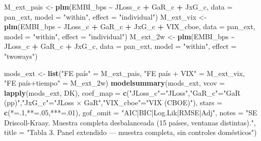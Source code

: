 \documentclass[
]{article}
\newenvironment{Shaded}{\begin{snugshade}}{\end{snugshade}}
\newcommand{\AttributeTok}[1]{\textcolor[rgb]{0.13,0.29,0.53}{#1}}
\newcommand{\DecValTok}[1]{\textcolor[rgb]{0.00,0.00,0.81}{#1}}
\newcommand{\FunctionTok}[1]{\textcolor[rgb]{0.13,0.29,0.53}{\textbf{#1}}}
\newcommand{\NormalTok}[1]{#1}
\newcommand{\OtherTok}[1]{\textcolor[rgb]{0.56,0.35,0.01}{#1}}
\newcommand{\SpecialCharTok}[1]{\textcolor[rgb]{0.81,0.36,0.00}{\textbf{#1}}}
\newcommand{\StringTok}[1]{\textcolor[rgb]{0.31,0.60,0.02}{#1}}
\begin{document}
\begin{Shaded}
\begin{Highlighting}[]
\NormalTok{M\_ext\_pais }\OtherTok{\textless{}{-}} \FunctionTok{plm}\NormalTok{(EMBI\_bps }\SpecialCharTok{\textasciitilde{}}\NormalTok{ JLoss\_c }\SpecialCharTok{+}\NormalTok{ GaR\_c }\SpecialCharTok{+}\NormalTok{ JxG\_c, }\AttributeTok{data =}\NormalTok{ pan\_ext, }\AttributeTok{model =} \StringTok{"within"}\NormalTok{, }\AttributeTok{effect =} \StringTok{"individual"}\NormalTok{)}
\NormalTok{M\_ext\_vix  }\OtherTok{\textless{}{-}} \FunctionTok{plm}\NormalTok{(EMBI\_bps }\SpecialCharTok{\textasciitilde{}}\NormalTok{ JLoss\_c }\SpecialCharTok{+}\NormalTok{ GaR\_c }\SpecialCharTok{+}\NormalTok{ JxG\_c }\SpecialCharTok{+}\NormalTok{ VIX\_cboe, }\AttributeTok{data =}\NormalTok{ pan\_ext, }\AttributeTok{model =} \StringTok{"within"}\NormalTok{, }\AttributeTok{effect =} \StringTok{"individual"}\NormalTok{)}
\NormalTok{M\_ext\_2w   }\OtherTok{\textless{}{-}} \FunctionTok{plm}\NormalTok{(EMBI\_bps }\SpecialCharTok{\textasciitilde{}}\NormalTok{ JLoss\_c }\SpecialCharTok{+}\NormalTok{ GaR\_c }\SpecialCharTok{+}\NormalTok{ JxG\_c, }\AttributeTok{data =}\NormalTok{ pan\_ext, }\AttributeTok{model =} \StringTok{"within"}\NormalTok{, }\AttributeTok{effect =} \StringTok{"twoways"}\NormalTok{)}

\NormalTok{mods\_ext }\OtherTok{\textless{}{-}} \FunctionTok{list}\NormalTok{(}\StringTok{"FE país"} \OtherTok{=}\NormalTok{ M\_ext\_pais, }\StringTok{"FE país + VIX"} \OtherTok{=}\NormalTok{ M\_ext\_vix, }\StringTok{"FE país+tiempo"} \OtherTok{=}\NormalTok{ M\_ext\_2w)}
\FunctionTok{modelsummary}\NormalTok{(mods\_ext, }\AttributeTok{vcov =} \FunctionTok{lapply}\NormalTok{(mods\_ext, DK),}
  \AttributeTok{coef\_map =} \FunctionTok{c}\NormalTok{(}\StringTok{"JLoss\_c"}\OtherTok{=}\StringTok{"JLoss"}\NormalTok{,}\StringTok{"GaR\_c"}\OtherTok{=}\StringTok{"GaR (pp)"}\NormalTok{,}\StringTok{"JxG\_c"}\OtherTok{=}\StringTok{"JLoss × GaR"}\NormalTok{,}\StringTok{"VIX\_cboe"}\OtherTok{=}\StringTok{"VIX (CBOE)"}\NormalTok{),}
  \AttributeTok{stars =} \FunctionTok{c}\NormalTok{(}\StringTok{\textquotesingle{}*\textquotesingle{}}\OtherTok{=}\NormalTok{.}\DecValTok{1}\NormalTok{,}\StringTok{\textquotesingle{}**\textquotesingle{}}\OtherTok{=}\NormalTok{.}\DecValTok{05}\NormalTok{,}\StringTok{\textquotesingle{}***\textquotesingle{}}\OtherTok{=}\NormalTok{.}\DecValTok{01}\NormalTok{), }\AttributeTok{gof\_omit =} \StringTok{"AIC|BIC|Log.Lik|RMSE|Adj"}\NormalTok{,}
  \AttributeTok{notes =} \StringTok{"SE Driscoll{-}Kraay. Muestra completa desbalanceada (15 países, ventanas distintas)."}\NormalTok{,}
  \AttributeTok{title =} \StringTok{"Tabla 3. Panel extendido — muestra completa, sin controles domésticos"}\NormalTok{)}
\end{Highlighting}
\end{Shaded}
\end{document}
